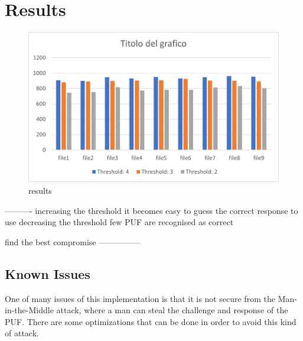 \chapter{Results}
\begin{figure}[H]
\vspace{0.5cm}
\includegraphics[width=\textwidth]{images/results.png}
\caption{results }
\label{fig:results} %
\end{figure}

----------
increasing the threshold it becomes easy to guess the correct response to use
decreasing the threshold few PUF are recognised as correct

find the best compromise
---------------


\section{Known Issues}
One of many issues of this implementation is that it is not secure from the Man-in-the-Middle attack, where a man can steal the challenge and response of the PUF.
There are some optimizations that can be done in order to avoid this kind of attack.

